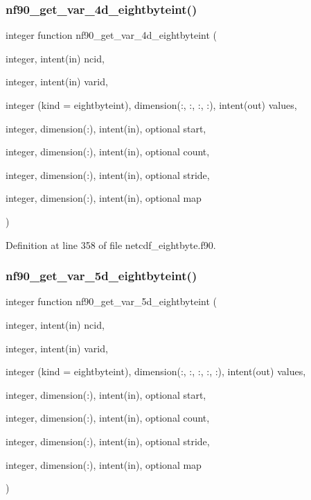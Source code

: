 \subsubsection{\texorpdfstring{nf90\+\_\+get\+\_\+var\+\_\+4d\+\_\+eightbyteint()}{nf90\_get\_var\_4d\_eightbyteint()}}
{\footnotesize\ttfamily integer function nf90\+\_\+get\+\_\+var\+\_\+4d\+\_\+eightbyteint (\begin{DoxyParamCaption}\item[{integer, intent(in)}]{ncid,  }\item[{integer, intent(in)}]{varid,  }\item[{integer (kind = eightbyteint), dimension(\+:, \+:, \+:, \+:), intent(out)}]{values,  }\item[{integer, dimension(\+:), intent(in), optional}]{start,  }\item[{integer, dimension(\+:), intent(in), optional}]{count,  }\item[{integer, dimension(\+:), intent(in), optional}]{stride,  }\item[{integer, dimension(\+:), intent(in), optional}]{map }\end{DoxyParamCaption})}



Definition at line 358 of file netcdf\+\_\+eightbyte.\+f90.

\mbox{\label{netcdf__eightbyte_8f90_aad2961aebfb639255928956049693640}} 
\subsubsection{\texorpdfstring{nf90\+\_\+get\+\_\+var\+\_\+5d\+\_\+eightbyteint()}{nf90\_get\_var\_5d\_eightbyteint()}}
{\footnotesize\ttfamily integer function nf90\+\_\+get\+\_\+var\+\_\+5d\+\_\+eightbyteint (\begin{DoxyParamCaption}\item[{integer, intent(in)}]{ncid,  }\item[{integer, intent(in)}]{varid,  }\item[{integer (kind = eightbyteint), dimension(\+:, \+:, \+:, \+:, \+:), intent(out)}]{values,  }\item[{integer, dimension(\+:), intent(in), optional}]{start,  }\item[{integer, dimension(\+:), intent(in), optional}]{count,  }\item[{integer, dimension(\+:), intent(in), optional}]{stride,  }\item[{integer, dimension(\+:), intent(in), optional}]{map }\end{DoxyParamCaption})}



